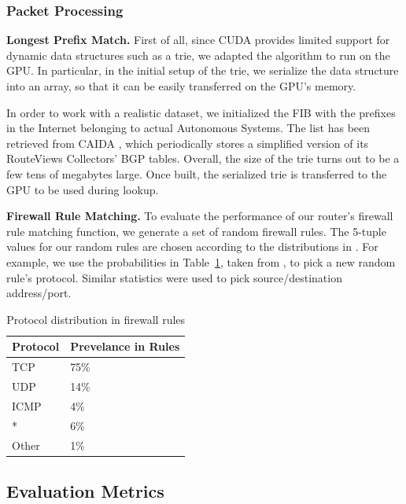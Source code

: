 \subsubsection{Packet Processing}
\label{sec:eval-proc}

\noindent \textbf{Longest Prefix Match.} First of all, since CUDA provides
limited support for dynamic data structures such as a trie, we adapted the
algorithm to run on the GPU. In particular, in the initial setup of the trie,
we serialize the data structure into an array, so that it can be easily
transferred on the GPU's memory.

In order to work with a realistic dataset, we initialized the FIB with the
prefixes in the Internet belonging to actual Autonomous Systems. The list has
been retrieved from CAIDA \cite{routeviews}, which periodically stores a
simplified version of its RouteViews Collectors' BGP tables. Overall, the size
of the trie turns out to be a few tens of megabytes large. Once built, the
serialized trie is transferred to the GPU to be used during lookup.


\noindent \textbf{Firewall Rule Matching.} To evaluate the performance of our
router's firewall rule matching function, we generate a set of random firewall
rules. The 5-tuple values for our random rules are chosen according to the
distributions in \cite{Rovniagin}. For example, we use the probabilities in
Table~\ref{tab:proto-dist}, taken from \cite{Rovniagin}, to pick a new random
rule's protocol. Similar statistics were used to pick source/destination
address/port.

\begin{table}[htbp]
   \centering
   \begin{tabular}{ l l } 
      \toprule
      \textbf{Protocol}  & \textbf{Prevelance in Rules} \\
      \midrule
	  TCP & 75\% \\
      UDP & 14\% \\
	  ICMP & 4\% \\
	  * & 6\% \\
	  Other & 1\% \\
      \bottomrule
   \end{tabular}
   \caption{Protocol distribution in firewall rules}
   \label{tab:proto-dist}
\end{table}

\subsection{Evaluation Metrics}
\label{sec:metrics}

